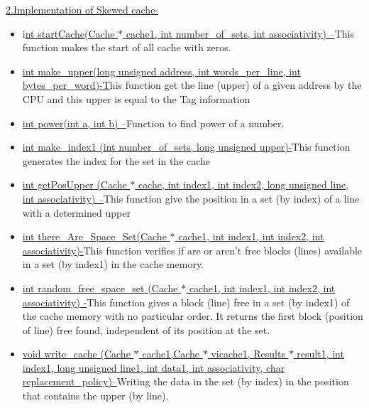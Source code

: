\documentclass[12pt]{article}
\begin{document}
\vspace{\baselineskip}
\setlength{\parskip}{8.04pt}
{\fontsize{16pt}{19.2pt}\selectfont \uline{2.Implementation of Skewed cache-}\par}\par

\setlength{\parskip}{0.0pt}
\begin{itemize}
	\item i\uline{nt startCache(Cache $\ast$ cache1, int number\_of\_sets, int associativity) –}This function makes the start of all cache with zeros.\par

	\item \uline{int make\_upper(long unsigned address, int words\_per\_line, int bytes\_per\_word)-T}his function get the line (upper) of a given address by the CPU and this upper is equal to the Tag information\par

	\item \uline{int power(int a, int b) –}Function to find power of a number.\par

	\item \uline{int make\_index1 (int number\_of\_sets, long unsigned upper)-}This function generates the index for the set in the cache\par

	\item \uline{int getPosUpper (Cache $\ast$ cache, int index1, int index2, long unsigned line, int associativity) –}This function give the position in a set (by index) of a line with a determined upper\par

	\item \uline{int there\_Are\_Space\_Set(Cache $\ast$ cache1, int index1, int index2, int associativity)-}This function verifies if are or aren't free blocks (lines) available in a set (by index1) in the cache memory.\par

	\item \uline{int random\_free\_space\_set (Cache $\ast$ cache1, int index1, int index2, int associativity) -}This function gives a block (line) free in a set (by index1) of the cache memory with no particular order. It returns the first block (position of line) free found, independent of its position at the set.\par

	\item \uline{void write\_cache (Cache $\ast$ cache1,Cache $\ast$ vicache1, Results $\ast$ result1, int index1, long unsigned line1, int data1, int associativity, char replacement\_policy)--}Writing the data in the set (by index) in the position that contains the upper (by line).\par


\end{itemize}
\end{document}
